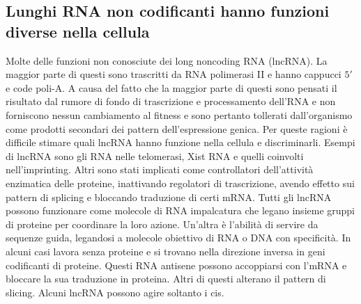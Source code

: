 \subsection{Lunghi RNA non codificanti hanno funzioni diverse nella cellula}
Molte delle funzioni non conosciute dei long noncoding RNA (lncRNA). La maggior parte di questi sono trascritti da RNA polimerasi II e hanno cappucci $5'$ e code poli-A. A causa del
fatto che la maggior parte di questi sono pensati il risultato dal rumore di fondo di trascrizione e processamento dell'RNA e non forniscono nessun cambiamento al fitness e sono pertanto
tollerati dall'organismo come prodotti secondari dei pattern dell'espressione genica. Per queste ragioni \`e difficile stimare quali lncRNA hanno funzione nella cellula e discriminarli. 
Esempi di lncRNA sono gli RNA nelle telomerasi, Xist RNA e quelli coinvolti nell'imprinting. Altri sono stati implicati come controllatori dell'attivit\`a enzimatica delle proteine, 
inattivando regolatori di trascrizione, avendo effetto sui pattern di splicing e bloccando traduzione di certi mRNA. Tutti gli lncRNA possono funzionare come molecole di RNA impalcatura
che legano insieme gruppi di proteine per coordinare la loro azione. Un'altra \`e l'abilit\`a di servire da sequenze guida, legandosi a molecole obiettivo di RNA o DNA con specificit\`a.
In alcuni casi lavora senza proteine e si trovano nella direzione inversa in geni codificanti di proteine. Questi RNA antisene possono accoppiarsi con l'mRNA e bloccare la sua traduzione
in proteina. Altri di questi alterano il pattern di slicing. Alcuni lncRNA possono agire soltanto i cis. 
